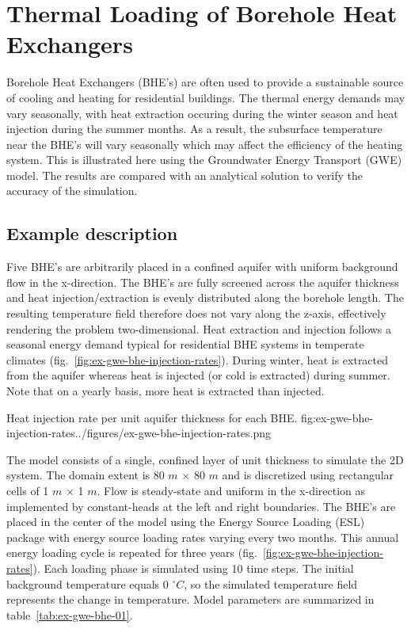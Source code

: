 \section{Thermal Loading of Borehole Heat Exchangers}

Borehole Heat Exchangers (BHE's) are often used to provide a sustainable source of cooling and heating for residential buildings. The thermal energy demands may vary seasonally, with heat extraction occuring during the winter season and heat injection during the summer months. As a result, the subsurface temperature near the BHE's will vary seasonally which may affect the efficiency of the heating system. This is illustrated here using the Groundwater Energy Transport (GWE) model. The results are compared with an analytical solution to verify the accuracy of the \mf simulation. 

\subsection{Example description}

Five BHE's are arbitrarily placed in a confined aquifer with uniform background flow in the x-direction. The BHE's are fully screened across the aquifer thickness and heat injection/extraction is evenly distributed along the borehole length. The resulting temperature field therefore does not vary along the z-axis, effectively rendering the problem two-dimensional. Heat extraction and injection follows a seasonal energy demand typical for residential BHE systems in temperate climates (fig.~\ref{fig:ex-gwe-bhe-injection-rates}). During winter, heat is extracted from the aquifer whereas heat is injected (or cold is extracted) during summer. Note that on a yearly basis, more heat is extracted than injected.

\begin{StandardFigure}{
    Heat injection rate per unit aquifer thickness for each BHE.
    }{fig:ex-gwe-bhe-injection-rates}{../figures/ex-gwe-bhe-injection-rates.png}
\end{StandardFigure}                                 

The \mf model consists of a single, confined layer of unit thickness to simulate the 2D system. The domain extent is 80 $m$ $\times$ 80 $m$ and is discretized using rectangular cells of 1 $m$ $\times$ 1 $m$. Flow is steady-state and uniform in the x-direction as implemented by constant-heads at the left and right boundaries. The BHE's are placed in the center of the model using the Energy Source Loading (ESL) package with energy source loading rates varying every two months. This annual energy loading cycle is repeated for three years (fig.~\ref{fig:ex-gwe-bhe-injection-rates}). Each loading phase is simulated using 10 time steps. The initial background temperature equals 0 $^{\circ} C$, so the simulated temperature field represents the change in temperature. Model parameters are summarized in table~\ref{tab:ex-gwe-bhe-01}.

